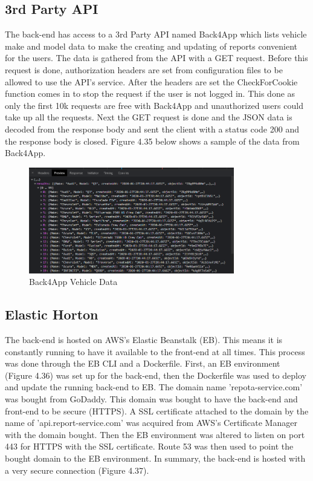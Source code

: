 \subsection{3rd Party API}
The back-end has access to a 3rd Party API named Back4App which lists vehicle make and model data to make the creating and updating of reports convenient for the users. The data is gathered from the API with a GET request. Before this request is done, authorization headers are set from configuration files to be allowed to use the API's service. After the headers are set the CheckForCookie function comes in to stop the request if the user is not logged in. This done as only the first 10k requests are free with Back4App and unauthorized users could take up all the requests. Next the GET request is done and the JSON data is decoded from the response body and sent the client with a status code 200 and the response body is closed. Figure 4.35 below shows a sample of the data from Back4App.

\begin{figure}[H]
    \caption{Back4App Vehicle Data}
    \label{image:back4app}
    \centering
    \includegraphics[width=0.8\textwidth]{images/horton/back4app/back4app_data.png}
\end{figure}

\subsection{Elastic Horton}
The back-end is hosted on AWS's Elastic Beanstalk (EB). This means it is constantly running to have it available to the front-end at all times. This process was done through the EB CLI and a Dockerfile. First, an EB environment (Figure 4.36) was set up for the back-end, then the Dockerfile was used to deploy and update the running back-end to EB. The domain name 'repota-service.com' was bought from GoDaddy. This domain was bought to have the back-end and front-end to be secure (HTTPS). A SSL certificate attached to the domain by the name of 'api.report-service.com' was acquired from AWS's Certificate Manager with the domain bought. Then the EB environment was altered to listen on port 443 for HTTPS with the SSL certificate. Route 53 was then used to point the bought domain to the EB environment. In summary, the back-end is hosted with a very secure connection (Figure 4.37).


